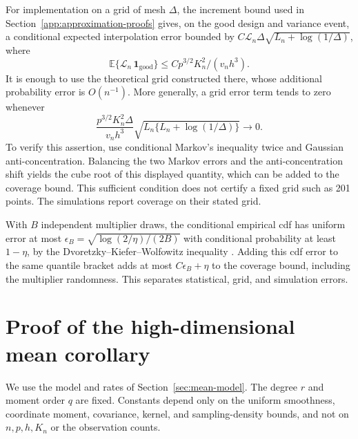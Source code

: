 \documentclass[12pt]{article}
\newcommand{\expect}{\mathbb{E}}
\numberwithin{equation}{section}
\begin{document}
For implementation on a grid of mesh $\Delta$, the increment bound used in
Section~\ref{app:approximation-proofs} gives, on the good design and variance
event, a conditional expected interpolation error bounded by
$C\mathcal L_n\Delta\sqrt{L_n+\log(1/\Delta)}$, where
\[
\expect\{\mathcal L_n\,\mathbf1_{\mathrm{good}}\}
\le C p^{3/2}K_n^2/(v_nh^3).
\]
It is enough to use the theoretical grid constructed there, whose
additional probability error is $O(n^{-1})$. More generally, a grid error
term tends to zero whenever
\[
\frac{p^{3/2}K_n^2\Delta}{v_nh^3}
\sqrt{L_n\{L_n+\log(1/\Delta)\}}\to0.
\]
To verify this assertion, use conditional Markov's inequality twice and
Gaussian anti-concentration. Balancing the two Markov errors and the
anti-concentration shift yields the cube root of this displayed quantity,
which can be added to the coverage bound.
This sufficient condition does not certify a fixed grid such as 201
points. The simulations report coverage on their stated grid.

With $B$ independent multiplier draws, the conditional empirical cdf has
uniform error at most $\epsilon_B=\sqrt{\log(2/\eta)/(2B)}$ with conditional
probability at least $1-\eta$, by the Dvoretzky--Kiefer--Wolfowitz inequality
\citep{massart_dkw_1990}. Adding this cdf error to the same quantile bracket
adds at most $C\epsilon_B+\eta$ to the coverage bound, including the
multiplier randomness. This separates statistical, grid, and simulation errors.


\section{Proof of the high-dimensional mean corollary}
\label{app:highd-mean}

We use the model and rates of Section~\ref{sec:mean-model}. The degree
$r$ and moment order $q$ are fixed. Constants depend only on the
uniform smoothness, coordinate moment, covariance, kernel, and
sampling-density bounds, and not on $n,p,h,K_n$ or the observation counts.
\end{document}
